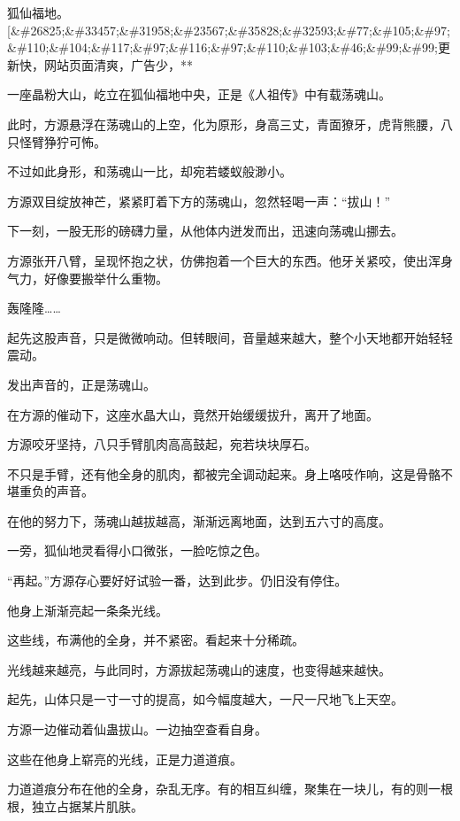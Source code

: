 
\begin{this_body}

狐仙福地。[\&\#26825;\&\#33457;\&\#31958;\&\#23567;\&\#35828;\&\#32593;\&\#77;\&\#105;\&\#97;\&\#110;\&\#104;\&\#117;\&\#97;\&\#116;\&\#97;\&\#110;\&\#103;\&\#46;\&\#99;\&\#99;更新快，网站页面清爽，广告少，**

一座晶粉大山，屹立在狐仙福地中央，正是《人祖传》中有载荡魂山。

此时，方源悬浮在荡魂山的上空，化为原形，身高三丈，青面獠牙，虎背熊腰，八只怪臂狰狞可怖。

不过如此身形，和荡魂山一比，却宛若蝼蚁般渺小。

方源双目绽放神芒，紧紧盯着下方的荡魂山，忽然轻喝一声：“拔山！”

下一刻，一股无形的磅礴力量，从他体内迸发而出，迅速向荡魂山挪去。

方源张开八臂，呈现怀抱之状，仿佛抱着一个巨大的东西。他牙关紧咬，使出浑身气力，好像要搬举什么重物。

轰隆隆……

起先这股声音，只是微微响动。但转眼间，音量越来越大，整个小天地都开始轻轻震动。

发出声音的，正是荡魂山。

在方源的催动下，这座水晶大山，竟然开始缓缓拔升，离开了地面。

方源咬牙坚持，八只手臂肌肉高高鼓起，宛若块块厚石。

不只是手臂，还有他全身的肌肉，都被完全调动起来。身上咯吱作响，这是骨骼不堪重负的声音。

在他的努力下，荡魂山越拔越高，渐渐远离地面，达到五六寸的高度。

一旁，狐仙地灵看得小口微张，一脸吃惊之色。

“再起。”方源存心要好好试验一番，达到此步。仍旧没有停住。

他身上渐渐亮起一条条光线。

这些线，布满他的全身，并不紧密。看起来十分稀疏。

光线越来越亮，与此同时，方源拔起荡魂山的速度，也变得越来越快。

起先，山体只是一寸一寸的提高，如今幅度越大，一尺一尺地飞上天空。

方源一边催动着仙蛊拔山。一边抽空查看自身。

这些在他身上崭亮的光线，正是力道道痕。

力道道痕分布在他的全身，杂乱无序。有的相互纠缠，聚集在一块儿，有的则一根根，独立占据某片肌肤。


\end{this_body}

